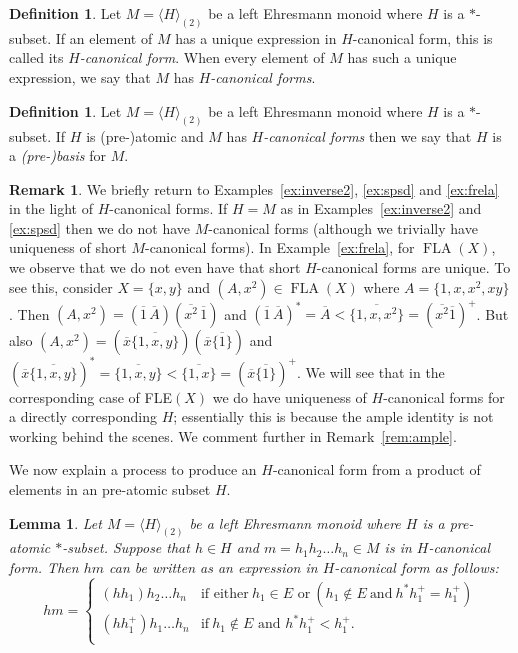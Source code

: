 \documentclass[12pt]{amsart}
\newtheorem{lem}[them]{Lemma}
\theoremstyle{definition}
\newtheorem{rem}[them]{Remark}
\newtheorem{defn}[them]{Definition}
\theoremstyle{definition}
\numberwithin{them}{section}
\numberwithin{equation}{section}
\DeclareMathOperator{\FLA}{FLA}
\begin{document}
{\begin{defn}\label{defn:hcanonical} Let $M=\langle H\rangle_{(2)}$  be a left Ehresmann monoid  where  $H$ is a  $*$-subset.  
 If an element  of $M$ has a unique expression in $H$-canonical form, this is called  its {\em $H$-canonical form}.  When every  element of $M$ has such a unique expression, we say that $M$ has {\em $H$-canonical forms}. 
\end{defn}

{\begin{defn}\label{defn:basis}  Let $M=\langle H\rangle_{(2)}$  be a left Ehresmann monoid  where  $H$ is a  $*$-subset. 
  If $H$ is (pre-)atomic and $M$ has {\em $H$-canonical forms} then we say that $H$ is a {\em (pre-)basis} for $M$.
\end{defn}

\begin{rem}\label{ex:notgood}  We briefly return to Examples~\ref{ex:inverse2}, \ref{ex:spsd} and \ref{ex:frela} in the light of $H$-canonical forms. 
If $H=M$ as in Examples~\ref{ex:inverse2} and \ref{ex:spsd}
then we do not have   $M$-canonical forms (although we trivially have uniqueness of short $M$-canonical forms). 
In Example~\ref{ex:frela}, for $\FLA(X)$, we observe that we do not even have that   short $H$-canonical forms are unique. To see this, consider $X=\{ x,y\}$ and
$(A,x^2)\in \FLA(X)$ where $A=\{ 1,x,x^2,xy\}$.
Then $(A,x^2)=(\overline{1}\, \overline{A})(\overline{x^2}\, \overline{1})$ and $(\overline{1}\, \overline{A})^*=\overline{A}< \overline{\{1,x,x^2\}}
=(\overline{x^2}\overline{1})^+$.  But also  $(A,x^2)=(\overline{x}\overline{\{ 1,x,y\}})(\overline{x}\overline{\{ 1\}})$ and 
$(\overline{x}\overline{\{ 1,x,y\}})^*=\overline{\{ 1,x,y\}}< \overline{\{ 1,x\}}=(\overline{x}\overline{\{ 1\}})^+$.   We will see that in the corresponding case of  FLE$(X)$ we do have uniqueness of $H$-canonical forms for a directly corresponding $H$; essentially this is because the ample identity is not working behind the scenes. We comment further in Remark~\ref{rem:ample}. 
\end{rem}



We now explain a process to produce an $H$-canonical form from a product of elements in an pre-atomic subset $H$.


\begin{lem}\label{h+m-Hormal form}
 Let $M=\langle H\rangle_{(2)}$  be a left Ehresmann monoid  where  $H$ is a  pre-atomic $*$-subset. 
 Suppose that $h \in H$ and $m = h_1h_2\dots h_n\in M$ is in $H$-canonical form. Then $hm$ can be written as an expression in $H$-canonical form as follows:
$$ hm=
	\begin{cases}
        (hh_1)h_2\dots h_n & \mbox{if\ either}\ h_1\in E\mbox{ or}\ (h_1\notin E\ \text{and}\ h^*h_1^+= h_1^+)\\
        (hh_1^+)h_1\dots h_n & \mbox{if}\  h_1\notin E\mbox{ and } h^*h_1^+< h_1^+.\\
	\end{cases}$$
\end{lem}

}}
\end{document}
